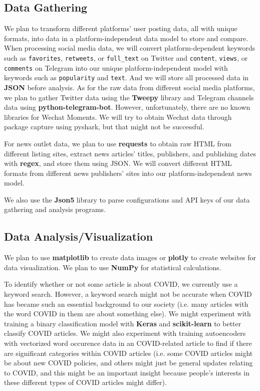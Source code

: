 \documentclass{article}
\begin{document}
    \subsection*{Data Gathering}
    \indent

    We plan to transform different platforms’ user posting data, all with unique formats, into data in a platform-independent data model to store and compare. When processing social media data, we will convert platform-dependent keywords such as \texttt{favorites}, \texttt{retweets}, or \texttt{full\_text} on Twitter and \texttt{content}, \texttt{views}, or \texttt{comments} on Telegram into our unique platform-independent model with keywords such as \texttt{popularity} and \texttt{text}. And we will store all processed data in \textbf{JSON} before analysis. As for the raw data from different social media platforms, we plan to gather Twitter data using the \textbf{Tweepy} library and Telegram channels data using \textbf{python-telegram-bot}. However, unfortunately, there are no known libraries for Wechat Moments. We will try to obtain Wechat data through package capture using pyshark, but that might not be successful.

    For news outlet data, we plan to use \textbf{requests} to obtain raw HTML from different listing sites, extract news articles’ titles, publishers, and publishing dates with \textbf{regex}, and store them using JSON. We will convert different HTML formats from different news publishers’ sites into our platform-independent news model.

    We also use the \textbf{Json5} library to parse configurations and API keys of our data gathering and analysis programs.

    \subsection*{Data Analysis/Visualization}
    \indent

    We plan to use \textbf{matplotlib} to create data images or \textbf{plotly} to create websites for data visualization. We plan to use \textbf{NumPy} for statistical calculations.

    To identify whether or not some article is about COVID, we currently use a keyword search. However, a keyword search might not be accurate when COVID has became such an essential background to our society (i.e. many articles with the word COVID in them are about something else). We might experiment with training a binary classification model with \textbf{Keras} and \textbf{scikit-learn} to better classify COVID articles. We might also experiment with training autoencoders with vectorized word occurence data in an COVID-related article to find if there are significant categories within COVID articles (i.e. some COVID articles might be about new COVID policies, and others might just be general updates relating to COVID, and this might be an important insight because people's interests in these different types of COVID articles might differ).
\end{document}
